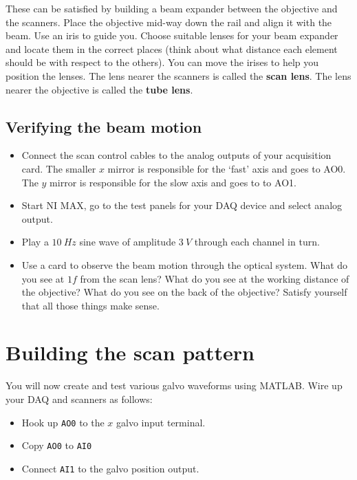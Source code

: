 \documentclass[a4paper]{report}
\begin{document}
These can be satisfied by building a beam expander between the objective and the scanners. 
Place the objective mid-way down the rail and align it with the beam. Use an iris to guide you.
Choose suitable lenses for your beam expander and locate them in the correct places 
(think about what distance each element should be with respect to the others). 
You can move the irises to help you position the lenses. 
The lens nearer the scanners is called the \textbf{scan lens}.
The lens nearer the objective is called the \textbf{tube lens}.

\subsection{Verifying the beam motion}
\begin{itemize}
\item Connect the scan control cables to the analog outputs of your acquisition card. 
The smaller $x$ mirror is responsible for the `fast' axis and goes to AO0. The $y$ mirror is responsible for the slow axis and goes to to AO1. 
\item Start NI MAX, go to the test panels for your DAQ device and select analog output. 
\item Play a $10~Hz$ sine wave of amplitude $3~V$ through each channel in turn. 
\item Use a card to observe the beam motion through the optical system. 
What do you see at $1f$ from the scan lens?
What do you see at the working distance of the objective?
What do you see on the back of the objective?
Satisfy yourself that all those things make sense.
\end{itemize}

\clearpage

\section{Building the scan pattern}

You will now create and test various galvo waveforms using MATLAB. 
Wire up your DAQ and scanners as follows:

\begin{itemize}
    \item Hook up \texttt{AO0} to the $x$ galvo input terminal.
    \item Copy \texttt{AO0} to \texttt{AI0}
    \item Connect \texttt{AI1} to the galvo position output.
\end{itemize}
\end{document}
